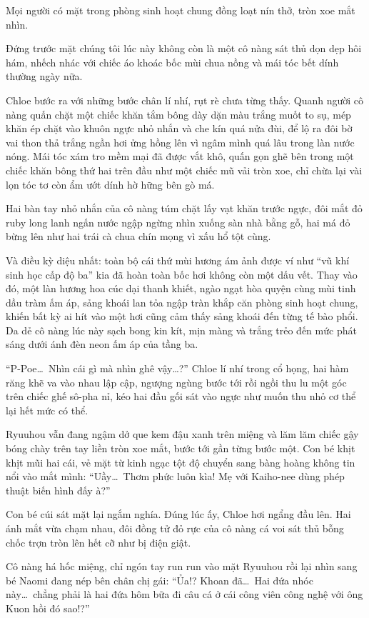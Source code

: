 \documentclass[../main.tex]{subfiles}
\begin{document}
Mọi người có mặt trong phòng sinh hoạt chung đồng loạt nín thở, tròn xoe mắt nhìn.

Đứng trước mặt chúng tôi lúc này không còn là một cô nàng sát thủ dọn dẹp hôi hám, nhếch nhác với chiếc áo khoác bốc mùi chua nồng và mái tóc bết dính thường ngày nữa.

Chloe bước ra với những bước chân lí nhí, rụt rè chưa từng thấy. Quanh người cô nàng quấn chặt một chiếc khăn tắm bông dày dặn màu trắng muốt to sụ, mép khăn ép chặt vào khuôn ngực nhỏ nhắn và che kín quá nửa đùi, để lộ ra đôi bờ vai thon thả trắng ngần hơi ửng hồng lên vì ngâm mình quá lâu trong làn nước nóng. Mái tóc xám tro mềm mại đã được vắt khô, quấn gọn ghẽ bên trong một chiếc khăn bông thứ hai trên đầu như một chiếc mũ vải tròn xoe, chỉ chừa lại vài lọn tóc tơ còn ẩm ướt dính hờ hững bên gò má.

Hai bàn tay nhỏ nhắn của cô nàng túm chặt lấy vạt khăn trước ngực, đôi mắt đỏ ruby long lanh ngấn nước ngập ngừng nhìn xuống sàn nhà bằng gỗ, hai má đỏ bừng lên như hai trái cà chua chín mọng vì xấu hổ tột cùng.

Và điều kỳ diệu nhất: toàn bộ cái thứ mùi hương ám ảnh được ví như ``vũ khí sinh học cấp độ ba'' kia đã hoàn toàn bốc hơi không còn một dấu vết. Thay vào đó, một làn hương hoa cúc dại thanh khiết, ngào ngạt hòa quyện cùng mùi tinh dầu tràm ấm áp, sảng khoái lan tỏa ngập tràn khắp căn phòng sinh hoạt chung, khiến bất kỳ ai hít vào một hơi cũng cảm thấy sảng khoái đến từng tế bào phổi. Da dẻ cô nàng lúc này sạch bong kin kít, mịn màng và trắng trẻo đến mức phát sáng dưới ánh đèn neon ấm áp của tầng ba.

``P-Poe\dots\ Nhìn cái gì mà nhìn ghê vậy\dots?'' Chloe lí nhí trong cổ họng, hai hàm răng khẽ va vào nhau lập cập, ngượng ngùng bước tới rồi ngồi thu lu một góc trên chiếc ghế sô-pha nỉ, kéo hai đầu gối sát vào ngực như muốn thu nhỏ cơ thể lại hết mức có thể.

Ryuuhou vẫn đang ngậm dở que kem đậu xanh trên miệng và lăm lăm chiếc gậy bóng chày trên tay liền tròn xoe mắt, bước tới gần từng bước một. Con bé khịt khịt mũi hai cái, vẻ mặt từ kinh ngạc tột độ chuyển sang bàng hoàng không tin nổi vào mắt mình: ``Uầy\dots\ Thơm phức luôn kìa! Mẹ với Kaiho-nee dùng phép thuật biến hình đấy à?''

Con bé cúi sát mặt lại ngắm nghía. Đúng lúc ấy, Chloe hơi ngẩng đầu lên. Hai ánh mắt vừa chạm nhau, đôi đồng tử đỏ rực của cô nàng cá voi sát thủ bỗng chốc trợn tròn lên hết cỡ như bị điện giật.

Cô nàng há hốc miệng, chỉ ngón tay run run vào mặt Ryuuhou rồi lại nhìn sang bé Naomi đang nép bên chân chị gái: ``Ủa!? Khoan đã\dots\ Hai đứa nhóc này\dots\ chẳng phải là hai đứa hôm bữa đi câu cá ở cái công viên công nghệ với ông Kuon hồi đó sao!?''
\end{document}
